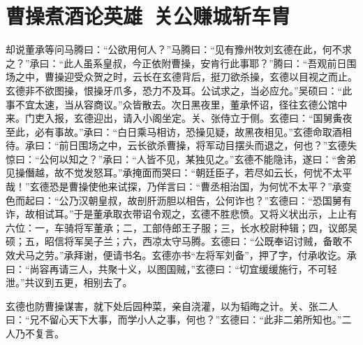 \chapter{曹操煮酒论英雄~关公赚城斩车胄}

却说董承等问马腾曰：“公欲用何人？”马腾曰：“见有豫州牧刘玄德在此，何不求之？”承曰：“此人虽系皇叔，今正依附曹操，安肯行此事耶？”腾曰：“吾观前日围场之中，曹操迎受众贺之时，云长在玄德背后，挺刀欲杀操，玄德以目视之而止。玄德非不欲图操，恨操牙爪多，恐力不及耳。公试求之，当必应允。”吴硕曰：“此事不宜太速，当从容商议。”众皆散去。次日黑夜里，董承怀诏，径往玄德公馆中来。门吏入报，玄德迎出，请入小阁坐定。关、张侍立于侧。玄德曰：“国舅夤夜至此，必有事故。”承曰：“白日乘马相访，恐操见疑，故黑夜相见。”玄德命取酒相待。承曰：“前日围场之中，云长欲杀曹操，将军动目摆头而退之，何也？”玄德失惊曰：“公何以知之？”承曰：“人皆不见，某独见之。”玄德不能隐讳，遂曰：“舍弟见操僭越，故不觉发怒耳。”承掩面而哭曰：“朝廷臣子，若尽如云长，何忧不太平哉！”玄德恐是曹操使他来试探，乃佯言曰：“曹丞相治国，为何忧不太平？”承变色而起曰：“公乃汉朝皇叔，故剖肝沥胆以相告，公何诈也？”玄德曰：“恐国舅有诈，故相试耳。”于是董承取衣带诏令观之，玄德不胜悲愤。又将义状出示，上止有六位：一，车骑将军董承；二，工部侍郎王子服；三，长水校尉种辑；四，议郎吴硕；五，昭信将军吴子兰；六，西凉太守马腾。玄德曰：“公既奉诏讨贼，备敢不效犬马之劳。”承拜谢，便请书名。玄德亦书“左将军刘备”，押了字，付承收讫。承曰：“尚容再请三人，共聚十义，以图国贼，”玄德曰：“切宜缓缓施行，不可轻泄。”共议到五更，相别去了。

玄德也防曹操谋害，就下处后园种菜，亲自浇灌，以为韬晦之计。关、张二人曰：“兄不留心天下大事，而学小人之事，何也？”玄德曰：“此非二弟所知也。”二人乃不复言。

